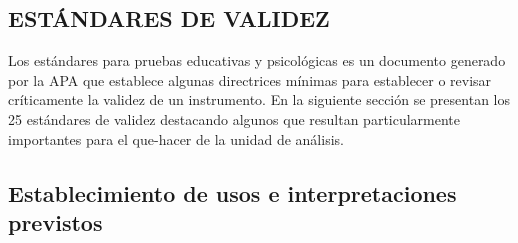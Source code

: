 \documentclass[
  letterpaper,
  DIV=11,
  numbers=noendperiod]{scrreprt}
\begin{document}
\subsection{ESTÁNDARES DE VALIDEZ}\label{estuxe1ndares-de-validez}

Los estándares para pruebas educativas y psicológicas es un documento
generado por la APA que establece algunas directrices mínimas para
establecer o revisar críticamente la validez de un instrumento. En la
siguiente sección se presentan los 25 estándares de validez destacando
algunos que resultan particularmente importantes para el que-hacer de la
unidad de análisis.

\subsection{Establecimiento de usos e interpretaciones
previstos}\label{establecimiento-de-usos-e-interpretaciones-previstos}
\end{document}

